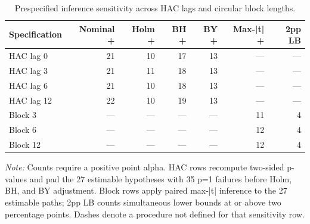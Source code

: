 \begin{table}[H]
\centering
\caption{Prespecified inference sensitivity across HAC lags and circular block lengths.}
\label{tab:inference-sensitivity}
\begingroup
\color{Ink}
\small
\begin{tabular}{lrrrrrr}
\toprule
\color{Navy}\textbf{Specification} & \color{Navy}\textbf{Nominal +} & \color{Navy}\textbf{Holm +} & \color{Navy}\textbf{BH +} & \color{Navy}\textbf{BY +} & \color{Navy}\textbf{Max-|t| +} & \color{Navy}\textbf{2pp LB} \\
\midrule
HAC lag 0 & 21 & 10 & 17 & 13 & --- & --- \\
HAC lag 3 & 21 & 11 & 18 & 13 & --- & --- \\
HAC lag 6 & 21 & 10 & 18 & 13 & --- & --- \\
HAC lag 12 & 22 & 10 & 19 & 13 & --- & --- \\
Block 3 & --- & --- & --- & --- & 11 & 4 \\
Block 6 & --- & --- & --- & --- & 12 & 4 \\
Block 12 & --- & --- & --- & --- & 12 & 4 \\
\bottomrule
\end{tabular}
\par\vspace{0.25em}\footnotesize\color{Ink}\emph{Note:} Counts require a positive point alpha. HAC rows recompute two-sided p-values and pad the 27 estimable hypotheses with 35 p=1 failures before Holm, BH, and BY adjustment. Block rows apply paired max-|t| inference to the 27 estimable paths; 2pp LB counts simultaneous lower bounds at or above two percentage points. Dashes denote a procedure not defined for that sensitivity row.
\endgroup
\end{table}
